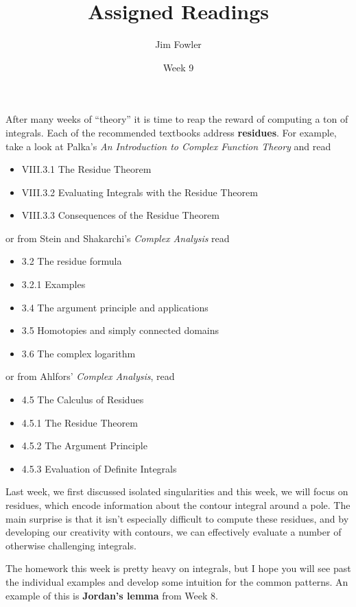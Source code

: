 \documentclass{homework}
\author{Jim Fowler}
\title{Assigned Readings}
\date{Week 9}
\begin{document}
\maketitle

After many weeks of ``theory'' it is time to reap the reward of
computing a ton of integrals.  Each of the recommended textbooks
address \textbf{residues}.  For example, take a look at Palka's
\textit{An Introduction to Complex Function Theory} and read
\begin{itemize}
\item VIII.3.1 The Residue Theorem
\item VIII.3.2 Evaluating Integrals with the Residue Theorem
\item VIII.3.3 Consequences of the Residue Theorem
\end{itemize}
or from Stein and Shakarchi's \textit{Complex Analysis} read
\begin{itemize}
\item 3.2 The residue formula
\item 3.2.1 Examples
\item 3.4 The argument principle and applications
\item 3.5 Homotopies and simply connected domains
\item 3.6 The complex logarithm
\end{itemize}
or from Ahlfors' \textit{Complex Analysis}, read
\begin{itemize}
\item 4.5 The Calculus of Residues
\item 4.5.1 The Residue Theorem
\item 4.5.2 The Argument Principle
\item 4.5.3 Evaluation of Definite Integrals
\end{itemize}
Last week, we first discussed isolated singularities and this week, we
will focus on residues, which encode information about the contour
integral around a pole.  The main surprise is that it isn't especially
difficult to compute these residues, and by developing our creativity
with contours, we can effectively evaluate a number of otherwise
challenging integrals.

The homework this week is pretty heavy on integrals, but I hope you
will see past the individual examples and develop some intuition for
the common patterns.  An example of this is \textbf{Jordan's lemma}
from Week 8.
\end{document}
